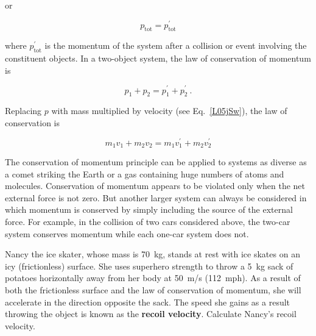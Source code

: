 \documentclass[main.tex]{subfiles}
\begin{document}
or

\begin{equation}
    p_{\text{tot}} = p_{\text{tot}}^{\prime}
\end{equation}

where $p_{\text{tot}}^{\prime}$ is the momentum of the system after a collision or event involving the constituent objects. In a two-object system, the law of conservation of momentum is

\begin{equation} \label{LgDXpb}
    p_1 + p_2 = p_1^{\prime} + p_2^{\prime}\ .
\end{equation}

Replacing $p$ with mass multiplied by velocity (see Eq.~\ref{L05jSw}), the law of conservation is 

\begin{equation} \label{eVkwoQ}
    m_1 v_1 + m_2 v_2 = m_1 v_1^{\prime} + m_2 v_2^{\prime}
\end{equation}

The conservation of momentum principle can be applied to systems as diverse as a comet striking the Earth or a gas containing huge numbers of atoms and molecules. Conservation of momentum appears to be violated only when the net external force is not zero. But another larger system can always be considered in which momentum is conserved by simply including the source of the external force. For example, in the collision of two cars considered above, the two-car system conserves momentum while each one-car system does not.

\begin{example} \label{W5BnBq} %
    Nancy the ice skater, whose mass is \SI{70}{kg}, stands at rest with ice skates on an icy (frictionless) surface. She uses superhero strength to throw a \SI{5}{kg} sack of potatoes horizontally away from her body at \SI{50}{m/s} (\SI{112}{mph}). As a result of both the frictionless surface and the law of conservation of momentum, she will accelerate in the direction opposite the sack. The speed she gains as a result throwing the object is known as the \textbf{recoil velocity}. Calculate Nancy's recoil velocity.
\end{example}
\end{document}
